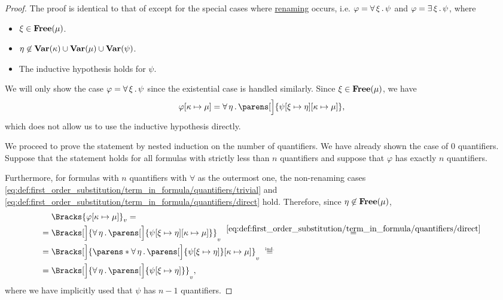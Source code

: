 \begin{proof}
   The proof is identical to that of  except for the special cases where \hyperref[rem:first_order_substitution_renaming_justification]{renaming} occurs, i.e. \( \varphi = \forall \thinspace \xi \thinspace . \thinspace \psi \) and \( \varphi = \exists \thinspace \xi \thinspace . \thinspace \psi \), where
  \begin{itemize}
    \item \( \xi \in \operatorname{\mathbf{Free}}(\mu) \).
    \item \( \eta \not\in \operatorname{\mathbf{Var}}(\kappa) \cup \operatorname{\mathbf{Var}}(\mu) \cup \operatorname{\mathbf{Var}}(\psi) \).
    \item The inductive hypothesis holds for \( \psi \).
  \end{itemize}

  We will only show the case \( \varphi = \forall \thinspace \xi \thinspace . \thinspace \psi \) since the existential case is handled similarly. Since \( \xi \in \operatorname{\mathbf{Free}}(\mu) \), we have
  \begin{equation*}
    \varphi[\kappa \mapsto \mu]
    =
    \qforall \eta \parens[\Big]{ \psi[\xi \mapsto \eta][\kappa \mapsto \mu] },
  \end{equation*}
  which does not allow us to use the inductive hypothesis directly.

  We proceed to prove the statement by nested induction on the number of quantifiers. We have already shown the case of \( 0 \) quantifiers. Suppose that the statement holds for all formulas with strictly less than \( n \) quantifiers and suppose that \( \varphi \) has exactly \( n \) quantifiers.

  Furthermore, for formulas with \( n \) quantifiers with \( \forall \) as the outermost one, the non-renaming cases \eqref{eq:def:first_order_substitution/term_in_formula/quantifiers/trivial} and \eqref{eq:def:first_order_substitution/term_in_formula/quantifiers/direct} hold. Therefore, since \( \eta \not\in \operatorname{\mathbf{Free}}(\mu) \),
  \begin{equation}\label{eq:thm:first_order_substitution_equivalence/term_in_formula/nested_induction}
    \begin{aligned}
      &\phantom{{}={}}
      \Bracks{\varphi[\kappa \mapsto \mu]}_v
      = \\ &=
      \Bracks[\Big]{\qforall \eta \parens[\Big]{ \psi[\xi \mapsto \eta][\kappa \mapsto \mu] }}_v
      \reloset {\eqref{eq:def:first_order_substitution/term_in_formula/quantifiers/direct}} = \\ &=
      \Bracks[\Big]{ \parens*{ \qforall \eta \parens[\Big]{ \psi[\xi \mapsto \eta] } }[\kappa \mapsto \mu] }_v
      \reloset {\T{ind.}} = \\ &=
      \Bracks[\Big]{\qforall \eta \parens[\Big]{ \psi[\xi \mapsto \eta] } }_v,
    \end{aligned}
  \end{equation}
  where we have implicitly used that \( \psi \) has \( n - 1 \) quantifiers.


\end{proof}
